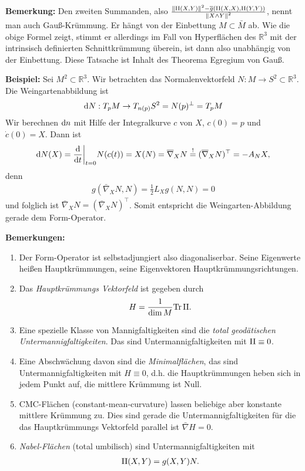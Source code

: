 \documentclass[12pt,a4paper]{article}
\def\R{\mathbb{R}}
\def\Tr{\mathrm{Tr}}
\begin{document}
{\bf Bemerkung:}
Den zweiten Summanden, also  $\frac{\left\|\mathrm{II}(X,Y)\right\|^2 - \overline{g}(\mathrm{II}(X,X),\mathrm{II}(Y,Y))}{
\left\|X\wedge Y\right\|^2}$, nennt man auch Gau\ss{}-Kr\"ummung. Er  h\"angt von der Einbettung
$M\subset\bar{M}$ ab. Wie die obige Formel zeigt, stimmt er allerdings im Fall von Hyperfl\"achen 
des $\R^3$ mit der intrinsisch definierten Schnittkr\"ummung \"uberein, ist dann also 
unabh\"angig von der Einbettung. Diese Tatsache ist Inhalt des Theorema Egregium von
Gau\ss{}.

\bigskip

{\bf Beispiel:}
Sei $M^2\subset\R^3$. Wir betrachten das Normalenvektorfeld $N: M\to
S^2\subset\R^3$. Die Weingartenabbildung ist
\begin{align*}
\mathrm{d} N : T_pM \to T_{n(p)}S^2 =N(p)^\bot = T_pM
\end{align*}
Wir berechnen $\mathrm{d} n$ mit Hilfe der Integralkurve $c$ von $X$, $c(0) =p$
und $\dot{c}(0) = X$. Dann ist
\begin{align*}
\mathrm{d} N(X) = \frac{\mathrm{d}}{\mathrm{d}t}\bigg|_{t=0} N(c(t))
= X(N) = \overline{\nabla}_X N \overset{!}{=} (\overline{\nabla}_X N)^\top = -A_NX, 
\end{align*}
denn
\begin{align*}
g(\bar{\nabla}_X N,N) = \frac{1}{2}L_X g(N,N) = 0
\end{align*}
und folglich ist $\bar{\nabla}_X N = (\bar{\nabla}_X N)^\top$. Somit entspricht
die Weingarten-Abbildung gerade dem Form-Operator.
\bigskip

{\bf Bemerkungen:}
\begin{enumerate}
\item 
Der Form-Operator ist selbstadjungiert also diagonaliserbar. Seine Eigenwerte
hei\ss{}en Hauptkr\"ummungen, seine Eigenvektoren Hauptkr\"ummungsrichtungen.
\item Das \emph{Hauptkr\"ummungs Vektorfeld} ist gegeben durch
\begin{align*}
H = \frac{1}{\dim M} \Tr\,\II.
\end{align*}
\item Eine spezielle Klasse von Mannigfaltigkeiten sind die \emph{total
geod\"atischen Untermannigfaltigkeiten}. Das sind Untermannigfaltigkeiten mit
$\mathrm{II} \equiv 0$.
\item Eine Abschw\"achung davon sind die \emph{Minimalfl\"achen}, das sind
Untermannigfaltigkeiten mit $H\equiv 0$, d.h. die Hauptkr\"ummungen heben sich in
jedem Punkt auf, die mittlere Kr\"ummung ist Null.
\item CMC-Fl\"achen (constant-mean-curvature) lassen beliebige aber konstante
mittlere Kr\"ummung zu. Dies sind gerade die Untermannigfaltigkeiten f\"ur die das
Hauptkr\"ummungs Vektorfeld parallel ist $\bar{\nabla}H = 0$.
\item \emph{Nabel-Fl\"achen} (total umbilisch) sind Untermannigfaltigkeiten mit
\begin{align*}
\mathrm{II}(X,Y) = g(X,Y)N.
\end{align*}
\end{enumerate}
\end{document}
